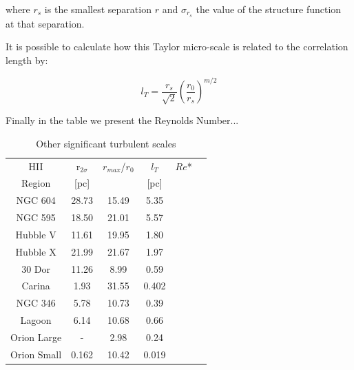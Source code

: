 \documentclass[fleqn,usenatbib, useAMS, a4paper]{mnras}
\begin{document}
where \(r_s\) is the smallest separation \(r\) and \(\sigma_{r_s}\) the value of the structure function at that separation. 

It is possible to calculate how this Taylor micro-scale is related to the correlation length by:

\begin{equation}\label{eq:TS1}
l_T=\dfrac{r_s}{\sqrt{2}}(\dfrac{r_0}{r_s})^{m/2}
\end{equation}  

Finally in the table we present the Reynolds Number...

\begin{table}
\begin{center}\caption{Other significant turbulent scales}
\begin{tabular}{cccccc}\hline
HII         &r$_{2\sigma}$ &\(r_{max}\)/\(r_0\)  &\(l_T\) & \(Re\)* \\
Region      &[pc]          &                     &[pc]    &   \\ \hline
NGC 604     &28.73         &15.49                &5.35    &   \\
NGC 595     &18.50         &21.01                &5.57    &   \\
Hubble V    &11.61         &19.95                &1.80    &   \\ 
Hubble X    &21.99         &21.67                &1.97    &   \\   
30 Dor      &11.26         &8.99                 &0.59    &   \\
Carina      &1.93          &31.55                &0.402   &   \\
NGC 346     &5.78          &10.73                &0.39    &   \\
Lagoon      &6.14          &10.68                &0.66    &   \\ 
Orion Large &-             &2.98                 &0.24    &   \\
Orion Small &0.162         &10.42                &0.019   &   \\ \hline	  
\end{tabular}\label{tab:ResII}
\end{center}
\end{table}  
\end{document}
